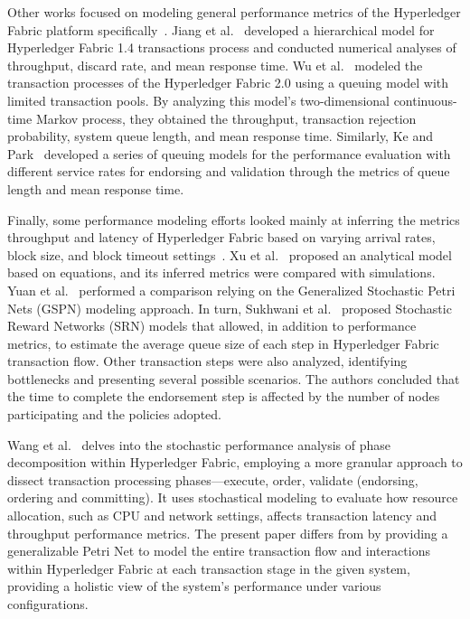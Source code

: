 Other works focused on modeling general performance metrics of the Hyperledger Fabric platform specifically~\cite{wu_acm_ease2022, jiang_springer_p2pna2020, ke_springer_cc2022, wang2023stochastic}. 
Jiang et al.~\cite{jiang_springer_p2pna2020} developed a hierarchical model for Hyperledger Fabric 1.4 transactions process and conducted numerical analyses of throughput, discard rate, and mean response time.
Wu et al.~\cite{wu_acm_ease2022} modeled the transaction processes of the Hyperledger Fabric 2.0 using a queuing model with limited transaction pools. By analyzing this model's two-dimensional continuous-time Markov process, they obtained the throughput, transaction rejection probability, system queue length, and mean response time.
Similarly, Ke and Park~\cite{ke_springer_cc2022} developed a series of queuing models for the performance evaluation with different service rates for endorsing and validation through the metrics of queue length and mean response time.

Finally, some performance modeling efforts looked mainly at inferring the metrics throughput and latency of Hyperledger Fabric based on varying arrival rates, block size, and block timeout settings~\cite{xu_ipm2021,sukhwani2018performance, yuan2020performance}. 
Xu et al.~\cite{xu_ipm2021} proposed an analytical model based on equations, and its inferred metrics were compared with simulations. 
%
Yuan et al.~\cite{yuan2020performance} performed a comparison relying on the Generalized Stochastic Petri Nets (GSPN) modeling approach.
In turn, Sukhwani et al.~\cite{sukhwani2018performance} proposed Stochastic Reward Networks (SRN) models that allowed, in addition to performance metrics, to estimate the average queue size of each step in Hyperledger Fabric transaction flow. Other transaction steps were also analyzed, identifying bottlenecks and presenting several possible scenarios. 
The authors concluded that the time to complete the endorsement step is affected by the number of nodes participating and the policies adopted.

Wang et al.~\cite{wang2023stochastic} delves into the stochastic performance analysis of phase decomposition within Hyperledger Fabric, employing a more granular approach to dissect transaction processing phases—execute, order, validate (endorsing, ordering and committing). It uses stochastical modeling to evaluate how resource allocation, such as CPU and network settings, affects transaction latency and throughput performance metrics. The present paper differs from \cite{wang2023stochastic} by providing a generalizable Petri Net to model the entire transaction flow and interactions within Hyperledger Fabric at each transaction stage in the given system, providing a holistic view of the system's performance under various configurations.

